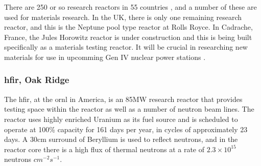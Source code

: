 There are 250 or so research reactors in 55 countries \cite{researchreactorstats}, and a number of these are used for materials research.  In the UK, there is only one remaining research reactor, and this is the Neptune pool type reactor at Rolls Royce\cite{neptunereactor}.  In Cadrache, France, the Jules Horowitz reactor is under construction and this is being built specifically as a materials testing reactor.  It will be crucial in researching new materials for use in upcomming Gen IV nuclear power stations \cite{researchreactorstats}.  


\FloatBarrier
\subsubsection{\acrlong{hfir}, Oak Ridge}

The \acrlong{hfir}, at the \acrlong{ornl} in America, is an 85MW research reactor that provides testing space within the reactor as well as a number of neutron beam lines.  The reactor uses highly enriched Uranium as its fuel source and is scheduled to operate at 100\% capacity for 161 days per year, in cycles of approximately 23 days.  A 30cm surround of Beryllium is used to reflect neutrons, and in the reactor core there is a high flux of thermal neutrons at a rate of $2.3 \times 10^{15}$ neutrons $cm^{-2} s^{-1}$\cite{hfirornluserguide}.


